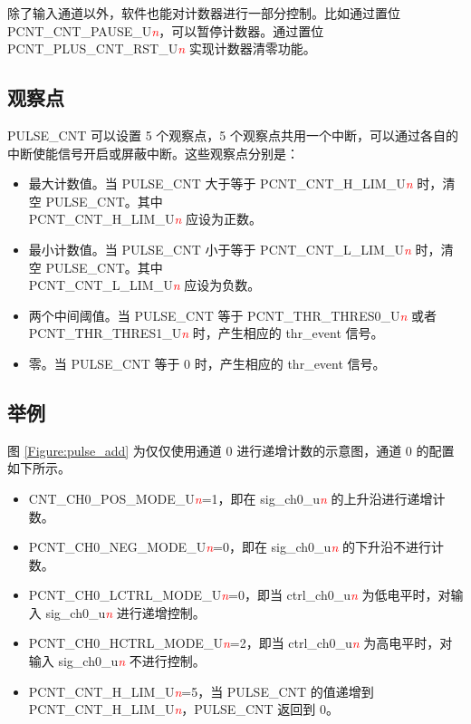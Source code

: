 \documentclass[main\_\_CN.tex]{subfiles}
\begin{document}
除了输入通道以外，软件也能对计数器进行一部分控制。比如通过置位 PCNT\_CNT\_PAUSE\_U\textcolor{red}{\it{n}}，可以暂停计数器。通过置位 PCNT\_PLUS\_CNT\_RST\_U\textcolor{red}{\it{n}} 实现计数器清零功能。

\subsection{观察点}\label{Watchpoints}

PULSE\_CNT 可以设置 5 个观察点，5 个观察点共用一个中断，可以通过各自的中断使能信号开启或屏蔽中断。这些观察点分别是：

\begin{itemize}
    \item 最大计数值。当 PULSE\_CNT 大于等于 PCNT\_CNT\_H\_LIM\_U\textcolor{red}{\it{n}} 时，清空 PULSE\_CNT。其中\\
PCNT\_CNT\_H\_LIM\_U\textcolor{red}{\it{n}} 应设为正数。
    \item 最小计数值。当 PULSE\_CNT 小于等于 PCNT\_CNT\_L\_LIM\_U\textcolor{red}{\it{n}} 时，清空 PULSE\_CNT。其中\\ PCNT\_CNT\_L\_LIM\_U\textcolor{red}{\it{n}} 应设为负数。
    \item 两个中间阈值。当 PULSE\_CNT 等于 PCNT\_THR\_THRES0\_U\textcolor{red}{\it{n}} 或者 PCNT\_THR\_THRES1\_U\textcolor{red}{\it{n}} 时，产生相应的 thr\_event 信号。
    \item 零。当 PULSE\_CNT 等于 0 时，产生相应的 thr\_event 信号。
\end{itemize}

\subsection{举例}

图 \ref{Figure:pulse_add} 为仅仅使用通道 0 进行递增计数的示意图，通道 0 的配置如下所示。

\begin{itemize}
    \item CNT\_CH0\_POS\_MODE\_U\textcolor{red}{\it{n}}=1，即在 sig\_ch0\_u\textcolor{red}{\it{n}} 的上升沿进行递增计数。
    \item PCNT\_CH0\_NEG\_MODE\_U\textcolor{red}{\it{n}}=0，即在 sig\_ch0\_u\textcolor{red}{\it{n}} 的下升沿不进行计数。
    \item PCNT\_CH0\_LCTRL\_MODE\_U\textcolor{red}{\it{n}}=0，即当 ctrl\_ch0\_u\textcolor{red}{\it{n}} 为低电平时，对输入 sig\_ch0\_u\textcolor{red}{\it{n}} 进行递增控制。
    \item PCNT\_CH0\_HCTRL\_MODE\_U\textcolor{red}{\it{n}}=2，即当 ctrl\_ch0\_u\textcolor{red}{\it{n}} 为高电平时，对输入 sig\_ch0\_u\textcolor{red}{\it{n}} 不进行控制。
    \item PCNT\_CNT\_H\_LIM\_U\textcolor{red}{\it{n}}=5，当 PULSE\_CNT 的值递增到 PCNT\_CNT\_H\_LIM\_U\textcolor{red}{\it{n}}，PULSE\_CNT 返回到 0。
\end{itemize}
\end{document}
